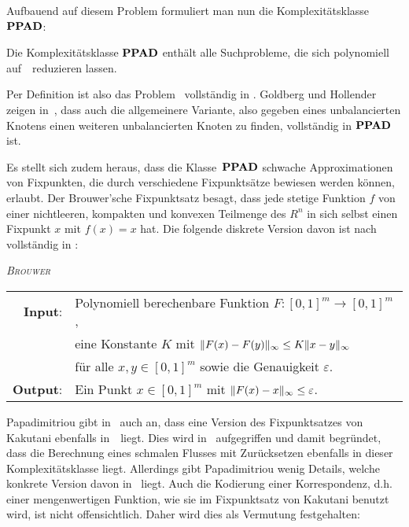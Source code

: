 Aufbauend auf diesem Problem formuliert man nun die Komplexitätsklasse~$\textbf{PPAD}$:

\begin{definition}
	Die Komplexitätsklasse $\textbf{PPAD}$ enthält alle Suchprobleme, die sich polynomiell auf~\EndOfTheLine\ reduzieren lassen.
\end{definition}

Per Definition ist also das Problem \EndOfTheLine~vollständig in \PPAD.
Goldberg und Hollender zeigen in~\cite[Theorem 15]{hairyball}, dass auch die allgemeinere Variante, also gegeben eines unbalancierten Knotens einen weiteren unbalancierten Knoten zu finden, vollständig in $\textbf{PPAD}$ ist.

Es stellt sich zudem heraus, dass die Klasse~$\textbf{PPAD}$ schwache Approximationen von Fixpunkten, die durch verschiedene Fixpunktsätze bewiesen werden können, erlaubt.
Der Brouwer'sche Fixpunktsatz besagt, dass jede stetige Funktion $f$ von einer nichtleeren, kompakten und konvexen Teilmenge des $R^n$ in sich selbst einen Fixpunkt $x$ mit $f(x) = x$ hat.
Die folgende diskrete Version davon ist nach~\cite{DASKALAKIS2019} vollständig in \PPAD:

\newcommand{\Brouwer}{\textsc{Brouwer}}

\begin{center}
	\begin{mdframed}
		\centering
		\emph{\Brouwer} \\[1em]
		\begin{tabular}{rl}
			{\bfseries Input}: &Polynomiell berechenbare Funktion $F: [0,1]^m \rightarrow [0, 1]^m$,\\
			& eine Konstante $K$ mit $\lVert F(x) - F(y)\rVert_\infty \leq K \lVert x - y\rVert_\infty$\\
			&für alle $x,y\in[0,1]^m$ sowie die Genauigkeit $\varepsilon$.\\
			{\bfseries Output}: & Ein Punkt $x\in[0,1]^m$ mit $\lVert F(x) - x\rVert_\infty \leq \varepsilon$.
		\end{tabular}
	\end{mdframed}
\end{center}

Papadimitriou gibt in~\cite{PPAD1994} auch an, dass eine Version des Fixpunktsatzes von Kakutani ebenfalls in~\PPAD\ liegt.
Dies wird in~\cite{Cominetti2015} aufgegriffen und damit begründet, dass die Berechnung eines schmalen Flusses mit Zurücksetzen ebenfalls in dieser Komplexitätsklasse liegt.
Allerdings gibt Papadimitriou wenig Details, welche konkrete Version davon in \PPAD\ liegt.
Auch die Kodierung einer Korrespondenz, d.h. einer mengenwertigen Funktion, wie sie im Fixpunktsatz von Kakutani benutzt wird, ist nicht offensichtlich.
Daher wird dies als Vermutung festgehalten:

